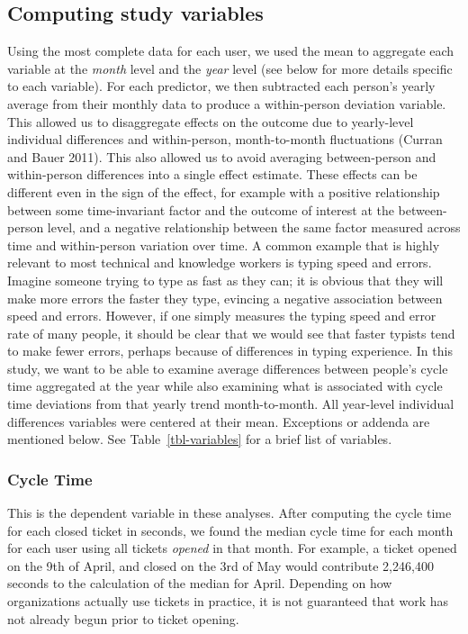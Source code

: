 \documentclass[
]{article}
\begin{document}
\subsection{Computing study variables}\label{computing-study-variables}

Using the most complete data for each user, we used the mean to
aggregate each variable at the \emph{month} level and the \emph{year}
level (see below for more details specific to each variable). For each
predictor, we then subtracted each person's yearly average from their
monthly data to produce a within-person deviation variable. This allowed
us to disaggregate effects on the outcome due to yearly-level individual
differences and within-person, month-to-month fluctuations (Curran and
Bauer 2011). This also allowed us to avoid averaging between-person and
within-person differences into a single effect estimate. These effects
can be different even in the sign of the effect, for example with a
positive relationship between some time-invariant factor and the outcome
of interest at the between-person level, and a negative relationship
between the same factor measured across time and within-person variation
over time. A common example that is highly relevant to most technical
and knowledge workers is typing speed and errors. Imagine someone trying
to type as fast as they can; it is obvious that they will make more
errors the faster they type, evincing a negative association between
speed and errors. However, if one simply measures the typing speed and
error rate of many people, it should be clear that we would see that
faster typists tend to make fewer errors, perhaps because of differences
in typing experience. In this study, we want to be able to examine
average differences between people's cycle time aggregated at the year
while also examining what is associated with cycle time deviations from
that yearly trend month-to-month. All year-level individual differences
variables were centered at their mean. Exceptions or addenda are
mentioned below. See Table~\ref{tbl-variables} for a brief list of
variables.

\subsubsection{Cycle Time}\label{cycle-time-1}

This is the dependent variable in these analyses. After computing the
cycle time for each closed ticket in seconds, we found the median cycle
time for each month for each user using all tickets \emph{opened} in
that month. For example, a ticket opened on the 9th of April, and closed
on the 3rd of May would contribute 2,246,400 seconds to the calculation
of the median for April. Depending on how organizations actually use
tickets in practice, it is not guaranteed that work has not already
begun prior to ticket opening.
\end{document}
